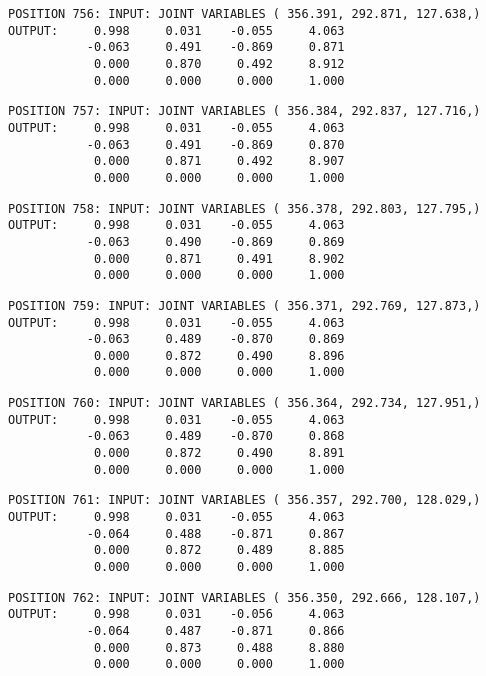 \begin{verbatim}
POSITION 756: INPUT: JOINT VARIABLES ( 356.391, 292.871, 127.638,)
OUTPUT:     0.998     0.031    -0.055     4.063
           -0.063     0.491    -0.869     0.871
            0.000     0.870     0.492     8.912
            0.000     0.000     0.000     1.000
\end{verbatim} \pagebreak[1]\begin{verbatim}
POSITION 757: INPUT: JOINT VARIABLES ( 356.384, 292.837, 127.716,)
OUTPUT:     0.998     0.031    -0.055     4.063
           -0.063     0.491    -0.869     0.870
            0.000     0.871     0.492     8.907
            0.000     0.000     0.000     1.000
\end{verbatim} \pagebreak[1]\begin{verbatim}
POSITION 758: INPUT: JOINT VARIABLES ( 356.378, 292.803, 127.795,)
OUTPUT:     0.998     0.031    -0.055     4.063
           -0.063     0.490    -0.869     0.869
            0.000     0.871     0.491     8.902
            0.000     0.000     0.000     1.000
\end{verbatim} \pagebreak[1]\begin{verbatim}
POSITION 759: INPUT: JOINT VARIABLES ( 356.371, 292.769, 127.873,)
OUTPUT:     0.998     0.031    -0.055     4.063
           -0.063     0.489    -0.870     0.869
            0.000     0.872     0.490     8.896
            0.000     0.000     0.000     1.000
\end{verbatim} \pagebreak[1]\begin{verbatim}
POSITION 760: INPUT: JOINT VARIABLES ( 356.364, 292.734, 127.951,)
OUTPUT:     0.998     0.031    -0.055     4.063
           -0.063     0.489    -0.870     0.868
            0.000     0.872     0.490     8.891
            0.000     0.000     0.000     1.000
\end{verbatim} \pagebreak[1]\begin{verbatim}
POSITION 761: INPUT: JOINT VARIABLES ( 356.357, 292.700, 128.029,)
OUTPUT:     0.998     0.031    -0.055     4.063
           -0.064     0.488    -0.871     0.867
            0.000     0.872     0.489     8.885
            0.000     0.000     0.000     1.000
\end{verbatim} \pagebreak[1]\begin{verbatim}
POSITION 762: INPUT: JOINT VARIABLES ( 356.350, 292.666, 128.107,)
OUTPUT:     0.998     0.031    -0.056     4.063
           -0.064     0.487    -0.871     0.866
            0.000     0.873     0.488     8.880
            0.000     0.000     0.000     1.000
\end{verbatim} \pagebreak[1]\begin{verbatim}

\end{verbatim}
